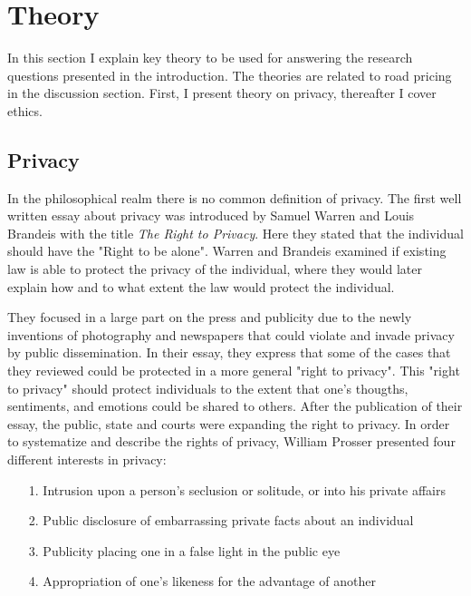 \section{Theory}
In this section I explain key theory to be used for answering the research questions presented in the introduction. The theories are related to road pricing in the discussion section. First, I present theory on privacy, thereafter I cover ethics. 

\subsection{Privacy}
In the philosophical realm there is no common definition of privacy. 
The first well written essay about privacy was introduced by Samuel Warren and Louis Brandeis with the title \textit{The Right to Privacy}. Here they stated that the individual should have the "Right to be alone". Warren and Brandeis examined if existing law is able to protect the privacy of the individual, where they would later explain how and to what extent the law would protect the individual. 

They focused in a large part on the press and publicity due to the newly inventions of photography and newspapers that could violate and invade privacy by public dissemination. In their essay, they express that some of the cases that they reviewed could be protected in a more general "right to privacy". This "right to privacy" should protect individuals to the extent that one's thougths, sentiments, and emotions could be shared to others. After the publication of their essay, the public, state and courts were expanding the right to privacy. In order to systematize and describe the rights of privacy, William Prosser presented four different interests in privacy:
\begin{itemize}
    \item[1.] Intrusion upon a person's seclusion or solitude, or into his private affairs
    \item[2.] Public disclosure of embarrassing private facts about an individual 
    \item[3.] Publicity placing one in a false light in the public eye
    \item[4.] Appropriation of one's likeness for the advantage of another \cite[p. 389]{prosser:1960} 
\end{itemize}

